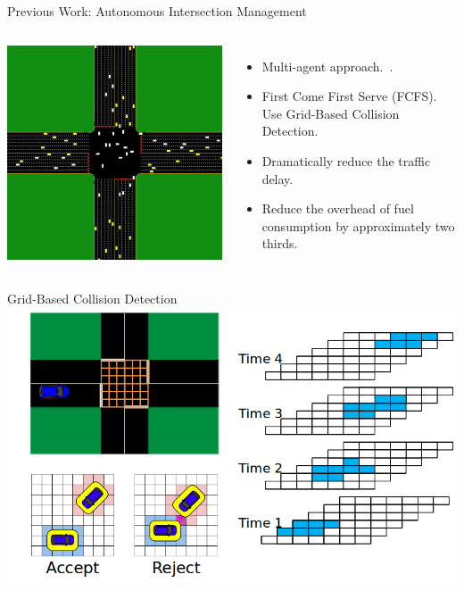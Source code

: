 \documentclass{beamer}
\begin{document}
\begin{frame}{Previous Work: Autonomous Intersection Management}
\begin{columns}[c]
		\includegraphics[width=\textwidth]{aim.png}
				
		\begin{itemize}
		\item Multi-agent approach.~\cite{bib:Dresner08Multiagent}.
		\item First Come First Serve (FCFS). Use Grid-Based Collision Detection.\pause
		\item Dramatically reduce the traffic delay.
		\item Reduce the overhead of fuel consumption by approximately
		two thirds.
		\end{itemize}
\end{columns}
\end{frame}

\begin{frame}{Grid-Based Collision Detection}
	\includegraphics[width=\textwidth]{grids.png}
\end{frame}
\end{document}

